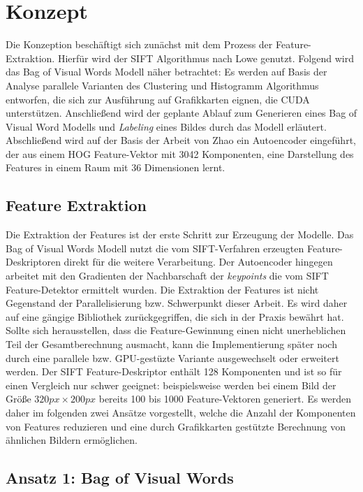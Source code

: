 \chapter{Konzept}

Die Konzeption beschäftigt sich zunächst mit dem Prozess der Feature-Extraktion. Hierfür wird der SIFT Algorithmus nach Lowe genutzt. Folgend wird das Bag of Visual Words Modell näher betrachtet: Es werden auf Basis der Analyse parallele Varianten des Clustering und Histogramm Algorithmus entworfen, die sich zur Ausführung auf Grafikkarten eignen, die CUDA unterstützen. Anschließend wird der geplante Ablauf zum Generieren eines Bag of Visual Word Modells und \textit{Labeling} eines Bildes durch das Modell erläutert.
Abschließend wird auf der Basis der Arbeit von Zhao \cite{aed2016} ein Autoencoder eingeführt, der aus einem HOG Feature-Vektor mit 3042 Komponenten, eine Darstellung des Features in einem Raum mit 36 Dimensionen lernt.

\section{Feature Extraktion}

Die Extraktion der Features ist der erste Schritt zur Erzeugung der Modelle. Das Bag of Visual Words Modell nutzt die vom SIFT-Verfahren erzeugten Feature-Deskriptoren direkt für die weitere Verarbeitung. Der Autoencoder hingegen arbeitet mit den Gradienten der Nachbarschaft der \textit{keypoints} die vom SIFT Feature-Detektor ermittelt wurden. Die Extraktion der Features ist nicht Gegenstand der Parallelisierung bzw. Schwerpunkt dieser Arbeit. Es wird daher auf eine gängige Bibliothek zurückgegriffen, die sich in der Praxis bewährt hat. Sollte sich herausstellen, dass die Feature-Gewinnung einen nicht unerheblichen Teil der Gesamtberechnung ausmacht, kann die Implementierung später noch durch eine parallele bzw. GPU-gestüzte Variante ausgewechselt oder erweitert werden.
Der SIFT Feature-Deskriptor enthält 128 Komponenten und ist so für einen Vergleich nur schwer geeignet: beispielsweise werden bei einem Bild der Größe $320px \times 200px$ bereits 100 bis 1000 Feature-Vektoren generiert. Es werden daher im folgenden zwei Ansätze vorgestellt, welche die Anzahl der Komponenten von Features reduzieren und eine durch Grafikkarten gestützte Berechnung von ähnlichen Bildern ermöglichen.

\section{Ansatz 1: Bag of Visual Words}


